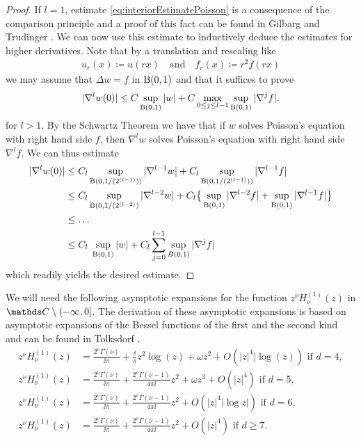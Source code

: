 \begin{proof}
  If $l = 1$, estimate \eqref{eq:interiorEstimatePoisson} is a consequence of the comparison principle and a proof of this fact can be found in Gilbarg and Trudinger \cite[3.4]{gilbarg}.
  We can now use this estimate to inductively deduce the estimates for higher derivatives.
  Note that by a translation and rescaling like
  \begin{align*}
    u_r(x) \coloneqq u(rx) \quad\text{and}\quad f_r(x) \coloneqq r^2 f(rx)
  \end{align*}
  we may assume that $\Delta w = f$ in $\mathrm{B}(0,1)$ and that it suffices to prove
  \begin{align}
    \label{eq:interiorEstimatePoissonSimple}
    |\nabla^l w(0) | \leq C \sup_{\mathrm{B}(0,1)} |w| + C \max_{0 \leq j \leq l - 1} \sup_{\mathrm{B}(0,1)} |\nabla^j f|.
  \end{align}
  for $l > 1$.
  By the Schwartz Theorem we have that if $w$ solves Poisson's equation with right hand side $f$, then $\nabla^l w$ solves Poisson's equation with right hand side $\nabla^l f$.
  We can thus estimate
  \begin{align*}
    |\nabla^l w(0)|
    &\leq C_l \sup_{\mathrm{B}(0,1/(2^{(l - 1)}))} |\nabla^{l - 1} w| + C_l \sup_{\mathrm{B}(0,1/(2^{(l-1)}))} |\nabla^{l - 1} f| \\
    &\leq C_l \sup_{\mathrm{B}(0,1/(2^{(l-2)})} |\nabla^{l - 2} w| + C_l \big\{ \sup_{\mathrm{B}(0,1)} |\nabla^{l - 2} f| + \sup_{\mathrm{B}(0,1)} |\nabla^{l - 1} f| \big\} \\
    &\leq \dots \\
    &\leq C_l \; \sup_{\mathrm{B}(0,1)} |w| + C_l \sum_{j = 0}^{l - 1} \sup_{B(0,1)} |\nabla^j f|
  \end{align*}
  which readily yields the desired estimate.
\end{proof}

We will need the following asymptotic expansions for the function $z^\nu H_\nu^{(1)}(z)$ in $\C \setminus (-\infty, 0]$.
The derivation of these asymptotic expansions is based on asymptotic expansions of the Bessel functions of the first and the second kind and can be found in Tolksdorf \cite[Sec. 4.2]{tolksdorf}.
\begin{align}
  z^{\nu}H_\nu^{(1)}(z) &= \frac{2^\nu \Gamma(\nu)}{\ii \pi} + \frac{\ii}{\pi} z^2 \log(z) + \omega z^2 + O(|z|^4 |\log(z)) \text{ if } d = 4, \label{eq:asymptoticd4}\\
  z^{\nu} H_{\nu}^{(1)}(z) &= \frac{2^\nu \Gamma(\nu)}{\ii\pi} + \frac{2^\nu \Gamma(\nu - 1)}{4 \pi \ii} z^2 + \omega z^3 + O(|z|^4) \text{ if } d = 5, \label{eq:asymptoticd5}\\
  z^\nu H_\nu^{(1)}(z) &= \frac{2^\nu \Gamma(\nu)}{\ii \pi} + \frac{2^\nu \Gamma(\nu - 1)}{4\pi \ii}z^2 + O(|z|^4 |\log z|) \text{ if } d = 6,\label{eq:asymptoticd6} \\
  z^\nu H_\nu^{(1)}(z) &= \frac{2^\nu \Gamma(\nu)}{\ii \pi} + \frac{2^\nu \Gamma(\nu - 1)}{4 \pi \ii} z^2 + O(|z|^4) \text{ if } d \geq 7.\label{eq:asymptoticd7}
\end{align}


